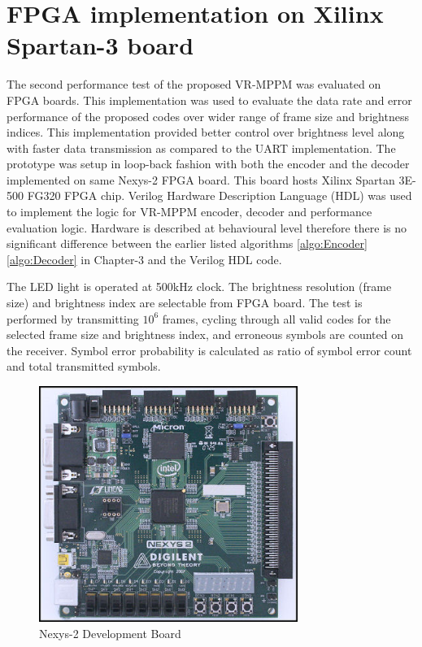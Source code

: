 \section{FPGA implementation on Xilinx Spartan-3 board}

The second performance test of the proposed VR-MPPM was evaluated on FPGA boards. This implementation was used to evaluate the data rate and error performance of the proposed codes over wider range of frame size and brightness indices. This implementation provided better control over brightness level along with faster data transmission as compared to the UART implementation. The prototype was setup in loop-back fashion with both the encoder and the decoder implemented on same Nexys-2 \cite{nexys2} FPGA board. This board hosts Xilinx Spartan 3E-500 FG320 FPGA chip.  Verilog Hardware Description Language (HDL) was used to implement the logic for VR-MPPM encoder, decoder and performance evaluation logic. Hardware is described at behavioural level therefore there is no significant difference between the earlier listed algorithms \ref{algo:Encoder} \ref{algo:Decoder} in Chapter-3 and the Verilog HDL code.

The LED light is operated at 500kHz clock. The brightness resolution (frame size) and brightness index are selectable from FPGA board. The test is performed by transmitting $10^6$ frames, cycling through all valid codes for the selected frame size and brightness index, and erroneous symbols are counted on the receiver. Symbol error probability is calculated as ratio of symbol error count and total transmitted symbols.
%
%



\begin{figure}[hbtp]
\centering
\includegraphics[angle=0,width=0.75\textwidth]{./Figures/NEXYS2_400.jpg}
\caption{Nexys-2 Development Board}
\label{fig:nexy2}
\end{figure}

